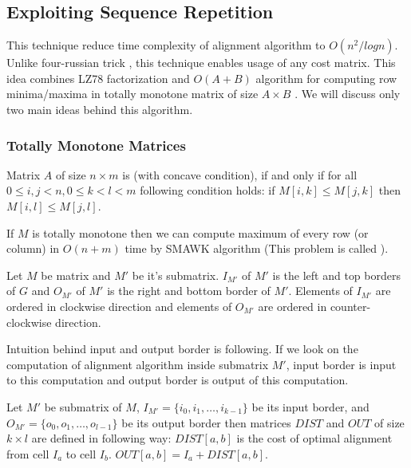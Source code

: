  
\subsection{Exploiting Sequence Repetition}

This technique reduce time complexity of alignment algorithm to $O(n^2/log n)$.
Unlike four-russian trick \cite{GusfieldBook}, this technique enables usage of
any cost matrix.  This idea combines LZ78 factorization \cite{Lempel1976} and
$O(A+B)$ algorithm for computing row minima/maxima in totally monotone matrix of
size $A\times B$ \cite{Aggarwal1987}. We will discuss only two main ideas behind
this algorithm.

\subsubsection{Totally Monotone Matrices}

\begin{definition}\cite{Crochemore2002}
Matrix $A$ of size $n\times m$ is  (with concave condition),
if and only if for all $0\leq i,j< n, 0\leq k<l<m$ following condition holds:
if $M[i,k]\leq M[j,k]$ then $M[i,l]\leq M[j,l]$.
\end{definition}

If $M$ is totally monotone then we can compute maximum of every row (or column)
in $O(n+m)$ time by SMAWK algorithm \cite{Aggarwal1987} (This problem is called
).

\begin{definition}\cite{Crochemore2002}
Let $M$ be matrix and $M'$ be it's
submatrix.  $I_{M'}$ of $M'$ is the left and top
borders of $G$ and  $O_{M'}$ of $M'$ is the right and
bottom border of $M'$. Elements of $I_{M'}$ are ordered in clockwise direction
and elements of $O_{M'}$ are ordered in counter-clockwise direction.
\end{definition}

Intuition behind input and output border is following. If we look on the
computation of alignment algorithm inside submatrix $M'$, input border is input
to this computation and output border is output of this computation.

\begin{definition}\cite{Crochemore2002}
Let $M'$ be submatrix of $M$, $I_{M'}=\{i_0,i_1,\dots,i_{k-1}\}$ be its input
border, and $O_{M'}=\{o_0,o_1,\dots,o_{l-1}\}$ be its output border then
matrices
$DIST$ and $OUT$ of size $k\times l$ are defined in following way:
$DIST[a,b]$ is the cost of optimal alignment from cell $I_a$ to cell $I_b$.
$OUT[a,b]=I_a+DIST[a,b]$.
\end{definition}

